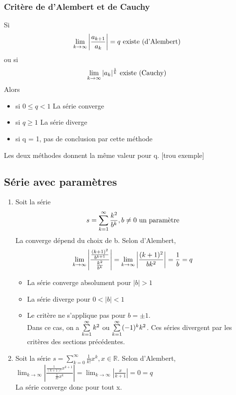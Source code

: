 \documentclass[12pt,a4paper]{article}
\begin{document}
{\subsubsection{Critère de d'Alembert et de Cauchy}
\begin{boite}
\Theoreme Si \begin{equation}
\lim\limits_{k \to \infty} \left|\frac{a_{k+1}}{a_k}\right| = q \mbox{ existe (d'Alembert)}
\end{equation}
ou si 
\begin{equation}
\lim\limits_{k\to\infty}|a_k|^{\frac{1}{k}} \mbox{ existe (Cauchy)}
\end{equation}
Alors
\begin{itemize}
	\item si $0\leq q < 1$ La série converge
	\item si $q \geq 1$ La série diverge
	\item si q = 1, pas de conclusion par cette méthode
\end{itemize}
\end{boite}
Les deux méthodes donnent la même valeur pour q.
[trou exemple]
\subsection{Série avec paramètres}
\begin{enumerate}
	\item Soit la série 
		\begin{equation}
			s = \sum\limits_{k=1}^{\infty}\frac{k^2}{b^k}, b \neq 0\mbox{ un paramètre}
		\end{equation}
		La converge dépend du choix de b. Selon d'Alembert, 
		\begin{equation}
		\lim\limits_{k\to \infty}\left| \frac{\frac{(k+1)^2}{b^{k + 1}}}{\frac{k^2}{b^k}} \right| =  \lim\limits_{k\to\infty}\left| \frac{(k+1)^2}{bk^2} \right| = \frac{1}{b} = q
		\end{equation}
		\begin{itemize}
			\item La série converge absolument pour $|b| > 1$
			\item La série diverge pour $0 < |b| < 1$
			\item Le critère ne s'applique pas pour $b = \pm 1$.\\
			Dans ce cas, on a $\sum\limits_{k=1}^{\infty}k^2$ ou $\sum\limits_{k=1}^{\infty}(-1)^kk^2$. 
			Ces séries divergent par les critères des sections précédentes.
		\end{itemize}
	\item Soit la série $s = \sum_{k=0}^{\infty} \frac{1}{k!} x^k, x \in \mathbb{R}$. Selon d'Alembert, \\ $\lim_{k \rightarrow \infty} \left| \frac{ \frac{1}{(k+1)!} x^{k+1} }{\frac{1}{k!} x^k} \right| = \lim_{k \rightarrow \infty} \left| \frac{x}{k+1} \right| = 0 = q$\\
		La série converge donc pour tout x. 
\end{enumerate}
}
\end{document}
